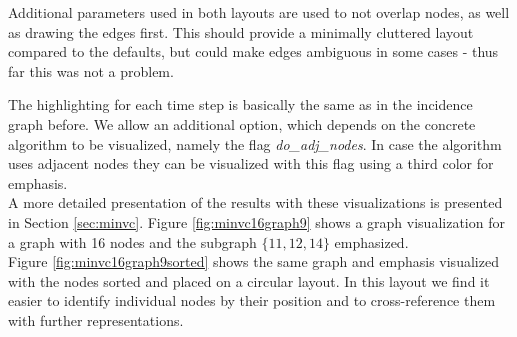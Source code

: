 \documentclass[a4paper, 12pt, bibliography=totoc]{scrartcl}
\begin{document}
Additional parameters used in both layouts are used to not overlap nodes, as well as drawing the edges first. This should provide a minimally cluttered layout compared to the defaults, but could make edges ambiguous in some cases - thus far this was not a problem.
%


The highlighting for each time step is basically the same as in the incidence graph before.
We allow an additional option, which depends on the concrete algorithm to be visualized, namely the flag \textit{do\_adj\_nodes}.
In case the algorithm uses adjacent nodes they can be visualized with this flag using a third color for emphasis.\\


A more detailed presentation of the results with these visualizations is presented in Section \ref{sec:minvc}.
Figure \ref{fig:minvc16graph9} shows a graph visualization for a graph with 16 nodes and the subgraph $\{11,12,14\}$ emphasized.\\
Figure \ref{fig:minvc16graph9sorted} shows the same graph and emphasis visualized with the nodes sorted and placed on a circular layout. In this layout we find it easier to identify individual nodes by their position and to cross-reference them with further representations.
\end{document}
